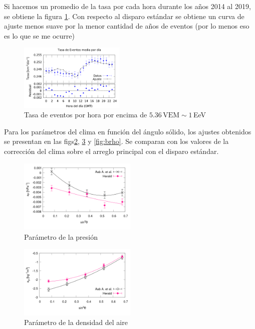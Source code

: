 Si hacemos un promedio de la tasa por cada hora durante los años 2014 al 2019, se obtiene la figura \ref{fig:hora}. Con respecto al disparo estándar se obtiene un curva de ajuste menos suave por la menor cantidad de años de eventos (por lo menos eso es lo que se me ocurre)
\begin{figure}[H]
	\centering
	\includegraphics[width=0.45\textwidth]{figura_tasa_por_hora_del_dia.png}
	\caption{Tasa de eventos por hora por encima de  $5.36\, \text{VEM} \sim 1 $\,EeV}
	\label{fig:hora}
\end{figure}

Para los parámetros del clima en función del ángulo sólido, los ajustes obtenidos se presentan en las figs\ref{fig:ap}, \ref{fig:arho} y \ref{fig:brho}. Se comparan con los valores de la corrección del clima sobre el arreglo principal con el disparo estándar.


\begin{figure}[H]
	\centering
	\includegraphics[width=0.5\textwidth]{figura_a_p.png}
	\caption{Parámetro de la presión}
	\label{fig:ap}
\end{figure}


\begin{figure}[H]
	\centering
	\includegraphics[width=0.5\textwidth]{figura_a_rho.png}
	\caption{Parámetro de la densidad del aire}
	\label{fig:arho}
\end{figure}

